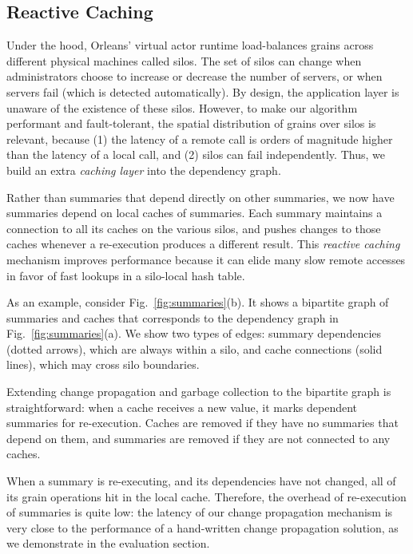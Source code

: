 \subsection{Reactive Caching}\label{sec:bp}

Under the hood, Orleans' virtual actor runtime load-balances grains across different physical machines called silos. The set of silos can change when administrators choose to increase or decrease the number of servers, or when servers fail (which is detected automatically). By design, the application layer is unaware of the existence of these silos. However, to make our algorithm performant and fault-tolerant, the spatial distribution of grains over silos is relevant, because (1) the latency of a remote call is orders of magnitude higher than the latency of a local call, and (2) silos can fail independently. Thus, we build an extra \emph{caching layer} into the dependency graph.

Rather than summaries that depend directly on other summaries, we now have summaries depend on local caches of summaries. Each summary maintains a connection to all its caches on the various silos, and pushes changes to those caches whenever a re-execution produces a different result. This \emph{reactive caching} mechanism improves performance because it can elide many slow remote accesses in favor of fast lookups in a silo-local hash table.

As an example, consider Fig.~\ref{fig:summaries}(b). It shows a bipartite graph of summaries and caches that corresponds to the dependency graph in Fig.~\ref{fig:summaries}(a). We show two types of edges: summary dependencies (dotted arrows), which are always within a silo, and cache connections (solid lines), which may cross silo boundaries. 

Extending change propagation and garbage collection to the bipartite graph is straightforward: when a cache receives a new value, it marks dependent summaries for re-execution. Caches are removed if they have no summaries that depend on them, and summaries are removed if they are not connected to any caches. 

 When a summary is re-executing, and its dependencies have not changed, all of its grain operations hit in the local cache. Therefore, the overhead of re-execution of summaries is quite low: the latency of our change propagation mechanism is very close to the performance of a hand-written change propagation solution, as we demonstrate in the evaluation section.

